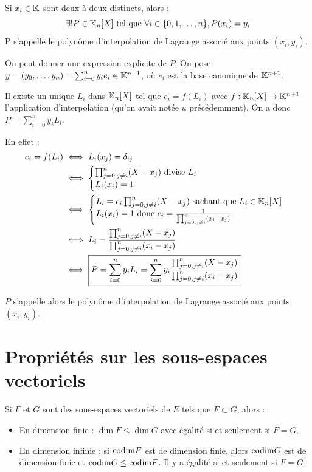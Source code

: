 \documentclass[11pt,a4paper]{report}
\begin{document}
\begin{proposition}
    Si $x_i \in \mathbb{K}$ sont deux à deux distincts, alors :
    $$\exists! P \in \mathbb{K}_n[X] \text{ tel que } \forall i \in \{0, 1, \dots, n\}, P(x_i) = y_i$$
    P s'appelle le polynôme d'interpolation de Lagrange associé aux points $(x_i, y_i)$.
\end{proposition}

On peut donner une expression explicite de $P$. On pose $y = (y_0, \dots, y_n) = \sum_{i=0}^n y_i e_i \in \mathbb{K}^{n+1}$, où $e_i$ est la base canonique de $\mathbb{K}^{n+1}$.

Il existe un unique $L_i$ dans $\mathbb{K}_n[X]$ tel que $e_i = f(L_i)$ avec $f : \mathbb{K}_n[X] \to \mathbb{K}^{n+1}$ l'application d'interpolation (qu'on avait notée $u$ précédemment). On a donc $P = \sum_{i=0}^n y_i L_i$.

En effet :
\begin{align*}
    e_i = f(L_i) &\iff L_i(x_j) = \delta_{ij} \\
    &\iff \begin{cases}
    \prod_{j=0, j \ne i}^n (X - x_j) \text{ divise } L_i \\
    L_i(x_i) = 1
    \end{cases} \\
    &\iff \begin{cases}
    L_i = c_i\prod_{j=0, j \ne i}^n (X - x_j) \text{ sachant que } L_i \in \mathbb{K}_n[X] \\
    L_i(x_i) = 1 \text{ donc } c_i = \frac{1}{\prod_{j=0, j \ne i}^n (x_i - x_j)}
    \end{cases}\\
    &\iff L_i = \frac{\prod_{j=0, j \ne i}^n (X - x_j)}{\prod_{j=0, j \ne i}^n (x_i - x_j)}\\
    &\iff \boxed{P = \sum_{i=0}^n y_i L_i = \sum_{i=0}^n y_i \frac{\prod_{j=0, j \ne i}^n (X - x_j)}{\prod_{j=0, j \ne i}^n (x_i - x_j)}}
\end{align*}

$P$ s'appelle alors le polynôme d'interpolation de Lagrange associé aux points $(x_i, y_i)$.
\todo

\section{Propriétés sur les sous-espaces vectoriels}

\begin{proposition}
    Si $F$ et $G$ sont des sous-espaces vectoriels de $E$ tels que $F \subset G$, alors :
    \begin{itemize}
        \item En dimension finie : $\dim F \le \dim G$ avec égalité si et seulement si $F = G$.
        \item En dimension infinie : si $\mathrm{codim} F$ est de dimension finie, alors $\mathrm{codim} G$ est de dimension finie et $\mathrm{codim} G \leq \mathrm{codim} F$. Il y a égalité si et seulement si $F = G$.
    \end{itemize}
\end{proposition}
\end{document}

